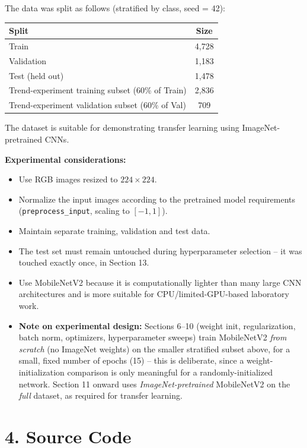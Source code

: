 \documentclass[10pt]{article}
\begin{document}
The data was split as follows (stratified by class, seed = 42):

\begin{center}
\begin{tabular}{|l|c|}
\hline
Split & Size\\
\hline
Train & 4{,}728\\
Validation & 1{,}183\\
Test (held out) & 1{,}478\\
\hline
Trend-experiment training subset (60\% of Train) & 2{,}836\\
Trend-experiment validation subset (60\% of Val) & 709\\
\hline
\end{tabular}
\end{center}

The dataset is suitable for demonstrating transfer learning using
ImageNet-pretrained CNNs.

\textbf{Experimental considerations:}

\begin{itemize}
\item Use RGB images resized to $224\times224$.
\item Normalize the input images according to the pretrained model requirements (\texttt{preprocess\_input}, scaling to $[-1,1]$).
\item Maintain separate training, validation and test data.
\item The test set must remain untouched during hyperparameter selection -- it was touched exactly once, in Section 13.
\item Use MobileNetV2 because it is computationally lighter than many
large CNN architectures and is more suitable for CPU/limited-GPU-based laboratory work.
\item \textbf{Note on experimental design:} Sections 6--10 (weight init, regularization, batch norm, optimizers, hyperparameter sweeps) train MobileNetV2 \emph{from scratch} (no ImageNet weights) on the smaller stratified subset above, for a small, fixed number of epochs (15) -- this is deliberate, since a weight-initialization comparison is only meaningful for a randomly-initialized network. Section 11 onward uses \emph{ImageNet-pretrained} MobileNetV2 on the \emph{full} dataset, as required for transfer learning.
\end{itemize}

\section*{4. Source Code}
\end{document}
